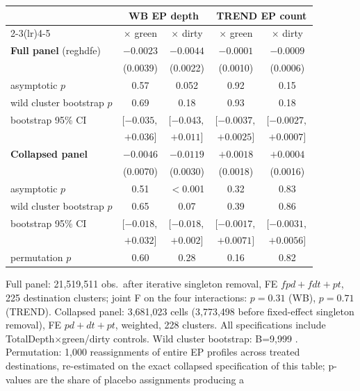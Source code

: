 \small
\begin{threeparttable}
\begin{tabular}{lcccc}
\toprule
 & \multicolumn{2}{c}{WB EP depth} & \multicolumn{2}{c}{TREND EP count} \\
\cmidrule(lr){2-3}\cmidrule(lr){4-5}
 & $\times$ green & $\times$ dirty & $\times$ green & $\times$ dirty \\
\midrule
\textbf{Full panel} (reghdfe) & $-0.0023$ & $-0.0044$ & $-0.0001$ & $-0.0009$ \\
 & (0.0039) & (0.0022) & (0.0010) & (0.0006) \\
\quad asymptotic $p$ & 0.57 & 0.052 & 0.92 & 0.15 \\
\quad wild cluster bootstrap $p$ & 0.69 & 0.18 & 0.93 & 0.18 \\
\quad bootstrap 95\% CI & $[-0.035,$  & $[-0.043,$  & $[-0.0037,$  & $[-0.0027,$  \\
 & $+0.036]$ & $+0.011]$ & $+0.0025]$ & $+0.0007]$ \\
\addlinespace
\textbf{Collapsed panel} & $-0.0046$ & $-0.0119$\sym{***} & $+0.0018$ & $+0.0004$ \\
 & (0.0070) & (0.0030) & (0.0018) & (0.0016) \\
\quad asymptotic $p$ & 0.51 & $<$0.001 & 0.32 & 0.83 \\
\quad wild cluster bootstrap $p$ & 0.65 & 0.07 & 0.39 & 0.86 \\
\quad bootstrap 95\% CI & $[-0.018,$  & $[-0.018,$  & $[-0.0017,$  & $[-0.0031,$  \\
 & $+0.032]$ & $+0.002]$ & $+0.0071]$ & $+0.0056]$ \\
\quad permutation $p$ & 0.60 & 0.28 & 0.16 & 0.82 \\
\bottomrule
\end{tabular}
\begin{tablenotes}\footnotesize
\item Full panel: 21{,}519{,}511 obs.\ after iterative singleton removal, FE
$fpd+fdt+pt$, 225 destination clusters; joint F on the four interactions: $p=0.31$ (WB),
$p=0.71$ (TREND). Collapsed panel: 3{,}681{,}023 cells (3{,}773{,}498 before
fixed-effect singleton removal), FE $pd+dt+pt$, weighted, 228 clusters. All specifications include TotalDepth$\times$green/dirty controls. Wild
cluster bootstrap: B=9{,}999 \citep{cameron2008}. Permutation: 1{,}000 reassignments of
entire EP profiles across treated destinations, re-estimated on the exact collapsed
specification of this table; p-values are the share of placebo assignments producing a

\end{tablenotes}
\end{threeparttable}
